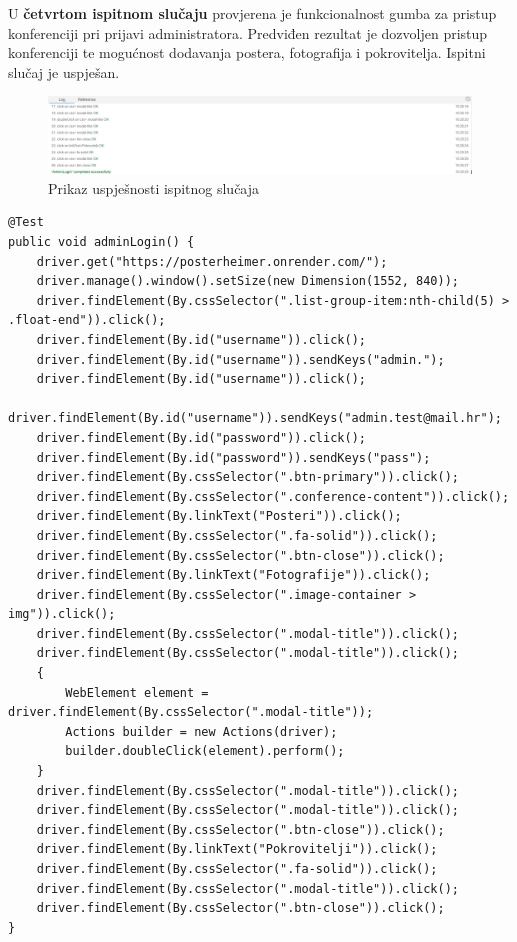 			U \textbf{četvrtom ispitnom slučaju} provjerena je funkcionalnost gumba za pristup konferenciji pri prijavi administratora. Predviđen rezultat je dozvoljen pristup konferenciji te mogućnost dodavanja postera, fotografija i pokrovitelja. Ispitni slučaj je uspješan.
			
			\begin{figure} [hbt!]
				\includegraphics[width=\linewidth]{Slike/adminLogin}
				\caption{Prikaz uspješnosti ispitnog slučaja}
			\end{figure}
			
			\begin{lstlisting}
@Test
public void adminLogin() {
	driver.get("https://posterheimer.onrender.com/");
	driver.manage().window().setSize(new Dimension(1552, 840));
	driver.findElement(By.cssSelector(".list-group-item:nth-child(5) > .float-end")).click();
	driver.findElement(By.id("username")).click();
	driver.findElement(By.id("username")).sendKeys("admin.");
	driver.findElement(By.id("username")).click();
	driver.findElement(By.id("username")).sendKeys("admin.test@mail.hr");
	driver.findElement(By.id("password")).click();
	driver.findElement(By.id("password")).sendKeys("pass");
	driver.findElement(By.cssSelector(".btn-primary")).click();
	driver.findElement(By.cssSelector(".conference-content")).click();
	driver.findElement(By.linkText("Posteri")).click();
	driver.findElement(By.cssSelector(".fa-solid")).click();
	driver.findElement(By.cssSelector(".btn-close")).click();
	driver.findElement(By.linkText("Fotografije")).click();
	driver.findElement(By.cssSelector(".image-container > img")).click();
	driver.findElement(By.cssSelector(".modal-title")).click();
	driver.findElement(By.cssSelector(".modal-title")).click();
	{
		WebElement element = driver.findElement(By.cssSelector(".modal-title"));
		Actions builder = new Actions(driver);
		builder.doubleClick(element).perform();
	}
	driver.findElement(By.cssSelector(".modal-title")).click();
	driver.findElement(By.cssSelector(".modal-title")).click();
	driver.findElement(By.cssSelector(".btn-close")).click();
	driver.findElement(By.linkText("Pokrovitelji")).click();
	driver.findElement(By.cssSelector(".fa-solid")).click();
	driver.findElement(By.cssSelector(".modal-title")).click();
	driver.findElement(By.cssSelector(".btn-close")).click();
}
			\end{lstlisting}
			
